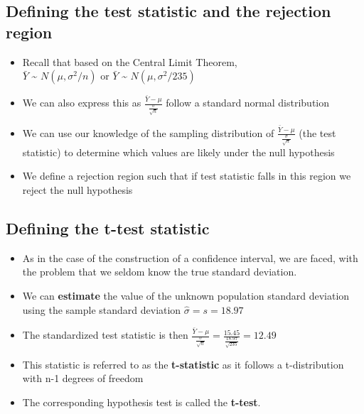 \documentclass[
]{book}
\providecommand{\tightlist}{%
  \setlength{\itemsep}{0pt}\setlength{\parskip}{0pt}}
\begin{document}
\hypertarget{defining-the-test-statistic-and-the-rejection-region}{%
\subsection{Defining the test statistic and the rejection region}\label{defining-the-test-statistic-and-the-rejection-region}}

\begin{itemize}
\item
  Recall that based on the Central Limit Theorem,\\
  \(\bar Y\) \textasciitilde{} \(N(\mu,\sigma^2/n)\) or \(\bar Y\) \textasciitilde{} \(N(\mu,\sigma^2/235)\)
\item
  We can also express this as \(\frac{\bar Y-\mu}{\frac{\sigma}{\sqrt n}}\) follow a standard normal distribution
\item
  We can use our knowledge of the sampling distribution of \(\frac{\bar Y-\mu}{\frac{\sigma}{\sqrt n}}\) (the test statistic) to determine which values are likely under the null hypothesis
\item
  We define a rejection region such that if test statistic falls in this region we reject the null hypothesis
\end{itemize}

\hypertarget{defining-the-t-test-statistic}{%
\subsection{Defining the t-test statistic}\label{defining-the-t-test-statistic}}

\begin{itemize}
\tightlist
\item
  As in the case of the construction of a confidence interval, we are faced, with the problem that we seldom know the true standard deviation.
\item
  We can \textbf{estimate} the value of the unknown population standard deviation using the sample standard deviation \(\hat{\sigma}=s=18.97\)
\item
  The standardized test statistic is then \(\frac{\bar Y-\mu}{\frac{\sigma}{\sqrt n}}=\frac{15.45}{\frac{18.97}{\sqrt{235}}}=12.49\)
\item
  This statistic is referred to as the \textbf{t-statistic} as it follows a t-distribution with n-1 degrees of freedom
\item
  The corresponding hypothesis test is called the \textbf{t-test}.
\end{itemize}
\end{document}
